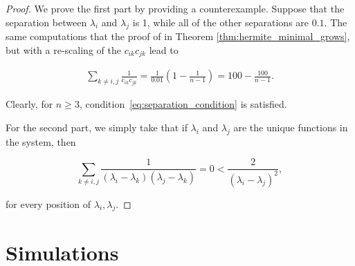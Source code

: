 \begin{proof}
    We prove the first part by providing a counterexample. Suppose that the separation between $\lambda_i$ and $\lambda_j$ is 1, while all of the other separations are $0.1$. The same computations that the proof of in Theorem \ref{thm:hermite_minimal_grows}, but with a re-scaling of the $c_{ik}c_{jk}$ lead to

    \begin{align*}
        \sum_{k\neq i,j} \frac{1}{c_{ik}c_{jk}} = \frac{1}{0.01}\left( 1 - \frac1{n-1}\right) = 100 - \frac{100}{n-1}.
    \end{align*}

    Clearly, for $n\ge 3$, condition~\eqref{eq:separation_condition} is satisfied.

    For the second part, we simply take that if $\lambda_i$ and $\lambda_j$ are the unique functions in the system, then 

    \begin{equation*}
        \sum_{k\neq i,j} \frac{1}{(\lambda_i - \lambda_k)(\lambda_j - \lambda_k)} = 0 < \frac{2}{(\lambda_i - \lambda_j)^2},
    \end{equation*}

    \noindent for every position of $\lambda_i, \lambda_j$.
\end{proof}




\section{Simulations}